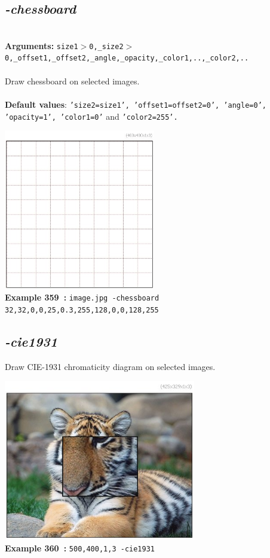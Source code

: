 \documentclass[a4paper,11pt,twoside]{book}
\begin{document}
\subsection{\emph{-chessboard} }\vspace*{-0.5em}
~\\\textbf{Arguments: } 
{\small \texttt{size1$>$0,\_size2$>$0,\_offset1,\_offset2,\_angle,\_opacity,\_color1,..,\_color2,..}}\\~\\
Draw chessboard on selected images.
~\\~\\\textbf{Default values}: {\small \texttt{'size2=size1', 'offset1=offset2=0', 'angle=0', 'opacity=1', 'color1=0'} and \texttt{'color2=255'.}}
\begin{center}\includegraphics[keepaspectratio=true,height=7cm,width=\textwidth]{img/gmic_def359.jpg}\\
{\footnotesize \textbf{Example 359~:} \texttt{image.jpg -chessboard 32,32,0,0,25,0.3,255,128,0,0,128,255}}
\end{center}

\subsection{\emph{-cie1931} }\vspace*{-0.5em}
Draw CIE-1931 chromaticity diagram on selected images.
\begin{center}\includegraphics[keepaspectratio=true,height=7cm,width=\textwidth]{img/gmic_def360.jpg}\\
{\footnotesize \textbf{Example 360~:} \texttt{500,400,1,3 -cie1931}}
\end{center}
\end{document}
